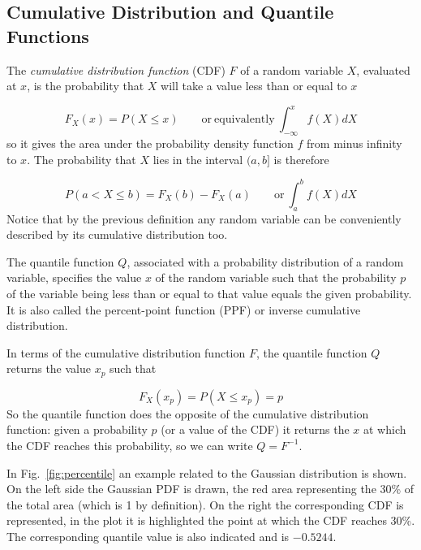 \subsection{Cumulative Distribution and Quantile Functions}\label{sec:quantile-function}

The \emph{cumulative distribution function} (CDF) \(F\) of a random variable \(X\), 
evaluated at \(x\), is the probability that \(X\) will take a value less than or equal to \(x\)

\begin{equation}
	F_X(x) = P(X \le x)\qquad\mathrm{or~equivalently}~\int_{-\infty}^{x}{f(X)dX}
\end{equation}
so it gives the area under the probability density function \(f\) from
minus infinity to \(x\).
The probability that \(X\) lies in the interval \((a,b]\) is therefore

\begin{equation}
	P(a\lt X \le b)=F_{X}(b)-F_{X}(a)\qquad\mathrm{or}~\int_a^b{f(X)dX}
\end{equation}
Notice that by the previous definition any random variable can be conveniently described by its 
cumulative distribution too.

The quantile function $Q$, associated with a probability distribution of a random variable, 
specifies the value $x$ of the random variable such that the probability $p$ of the 
variable being less than or equal to that value equals the given probability.
It is also called the percent-point function (PPF) or inverse cumulative distribution.

In terms of the cumulative distribution function \(F\), the quantile function \(Q\)
returns the value \(x_p\) such that 

\begin{equation}
F_{X}(x_p)=P(X\le x_p)=p
\end{equation}
So the quantile function does the opposite of the cumulative distribution function: 
given a probability \(p\) (or a value of the CDF) it returns the \(x\) at which the 
CDF reaches this probability, so we can write $Q=F^{-1}$.

In Fig.~\ref{fig:percentile} an example related to the
Gaussian distribution is shown. On the left side the Gaussian PDF is drawn,
the red area representing the 30\% of the total area (which is 1 by definition). 
On the right the corresponding CDF is represented, in the plot it is highlighted the point 
at which the CDF reaches 30\%. The corresponding quantile value is also indicated and 
is $-0.5244$.

